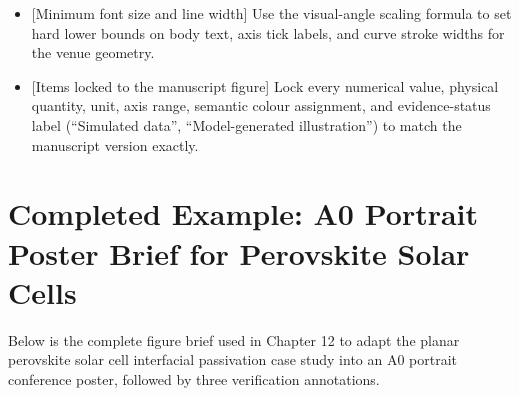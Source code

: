 \begin{enumerate}
\begin{itemize}
    \item {[Minimum font size and line width]} Use the visual-angle scaling formula to set hard lower bounds on body text, axis tick labels, and curve stroke widths for the venue geometry.
    \item {[Items locked to the manuscript figure]} Lock every numerical value, physical quantity, unit, axis range, semantic colour assignment, and evidence-status label (``Simulated data'', ``Model-generated illustration'') to match the manuscript version exactly.
  \end{itemize}
\end{enumerate}

\section{Completed Example: A0 Portrait Poster Brief for Perovskite Solar Cells}

Below is the complete figure brief used in Chapter 12 to adapt the planar perovskite solar cell interfacial passivation case study into an A0 portrait conference poster, followed by three verification annotations.

